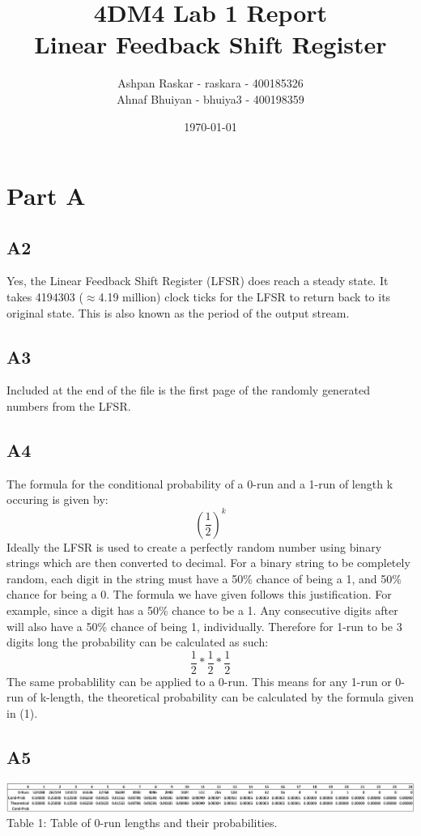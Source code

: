 \documentclass[12pt, letterpaper, titlepage, hidelinks]{article}
\title{4DM4 Lab 1 Report \\ Linear Feedback Shift Register}
\author{Ashpan Raskar - raskara - 400185326\\
		Ahnaf Bhuiyan - bhuiya3 - 400198359}
\date{\today}
\begin{document}
\maketitle
\newpage
\setlength{\parindent}{0pt}
\setcounter{secnumdepth}{0}
\section{Part A}
	\subsection{A2}
		Yes, the Linear Feedback Shift Register (LFSR) does reach a steady state. It takes 4194303 ($\approx$4.19 million) clock ticks for the LFSR to return back to its original state. This is also known as the period of the output stream.
	\subsection{A3}
		Included at the end of the file is the first page of the randomly generated numbers from the LFSR.
	\subsection{A4}
		The formula for the conditional probability of a 0-run and a 1-run of length k occuring is given by:
		\begin{equation}
			(\frac{1}{2})^{k}
		\end{equation}
		Ideally the LFSR is used to create a perfectly random number using binary strings which are then converted to decimal. For a binary string to be completely random, each digit in the string must have a 50\% chance of being a 1, and 50\% chance for being a 0. The formula we have given follows this justification. For example, since a digit has a 50\% chance to be a 1. Any consecutive digits after will also have a 50\% chance of being 1, individually. Therefore for 1-run to be 3 digits long the probability can be calculated as such:
		\begin{equation}
			\frac{1}{2} * \frac{1}{2} * \frac{1}{2}
		\end{equation}
		The same probablility can be applied to a 0-run. This means for any 1-run or 0-run of k-length, the theoretical probability can be calculated by the formula given in (1).
	\subsection{A5}
		\includegraphics[width=\textwidth]{0_run_table}
		Table 1: Table of 0-run lengths and their probabilities.
\end{document}
